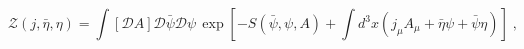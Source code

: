 \begin{equation}\label{eq:defz}
{\mathcal Z}(j,{\bar \eta},\eta )=\int [{\mathcal D}A ] {\mathcal
D}{\bar\psi}{\mathcal D}\psi \, \exp \left[- S({\bar\psi},\psi,A) + \int
d^3x( j_\mu A_\mu + {\bar\eta}\psi + {\bar\psi} \eta )\right]\;,
\end{equation}


